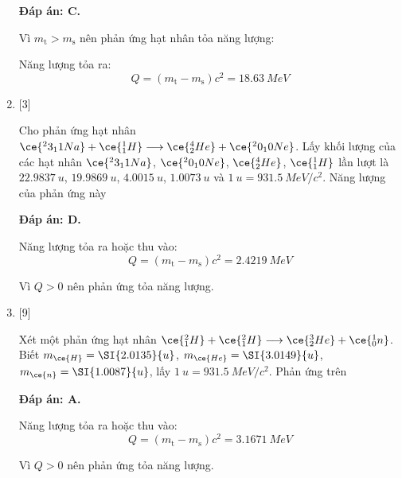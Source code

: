 \begin{enumerate}[label=\bfseries Câu \arabic*:]
	\loigiai
	{		\textbf{Đáp án: C.}
		
		Vì $m_{\text{t}}>m_{\text{s}}$ nên phản ứng hạt nhân tỏa năng lượng:
		
		Năng lượng tỏa ra:
		$$Q=(m_{\text{t}} - m_\text{s}) c^2 = \SI{18.63}{MeV}$$
		
	}
	
	\item {} [3]
	\cauhoi
	{Cho phản ứng hạt nhân $\ce{^23_11 Na} + \ce{^1_1 H} \longrightarrow \ce{^4_2 He} + \ce{^20_10 Ne}$. Lấy khối lượng của các hạt nhân $\ce{^23_11 Na}$, $\ce{^20_10 Ne}$, $\ce{^4_2 He}$, $\ce{^1_1 H}$ lần lượt là $\SI{22.9837}{u}$, $\SI{19.9869}{u}$, $\SI{4.0015}{u}$, $\SI{1.0073}{u}$ và $\SI{1}{u} = \SI{931.5}{MeV/c^2}$. Năng lượng của phản ứng này
	}
	
	\loigiai
	{		\textbf{Đáp án: D.}
		
		Năng lượng tỏa ra hoặc thu vào:
		$$Q=(m_{\text{t}} - m_\text{s}) c^2 = \SI{2.4219}{MeV}$$
		
		Vì $Q>0$ nên phản ứng tỏa năng lượng.
	}
	\item {} [9]
	\cauhoi
	{Xét một phản ứng hạt nhân $\ce{^2_1 H} + \ce{^2_1 H} \longrightarrow \ce{^3_2 He} + \ce{^1_0 n}$. Biết $m_{\ce{H}} = \SI{2.0135}{u}$, $m_{\ce{He}} = \SI{3.0149}{u}$, $m_{\ce{n}} = \SI{1.0087}{u}$, lấy $\SI{1}{u} = \SI{931.5}{MeV/c^2}$. Phản ứng trên
	}
	
	\loigiai
	{		\textbf{Đáp án: A.}
		
		Năng lượng tỏa ra hoặc thu vào:
		$$Q=(m_{\text{t}} - m_\text{s}) c^2 = \SI{3.1671}{MeV}$$
		
		Vì $Q>0$ nên phản ứng tỏa năng lượng.
	}


\end{enumerate}
